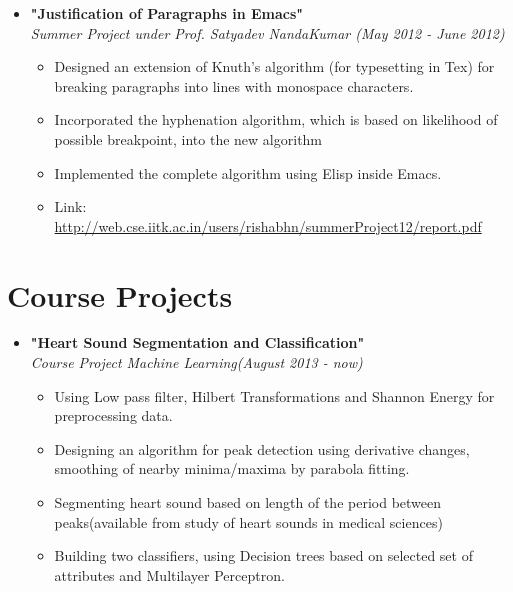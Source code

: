 \documentclass[margin,line]{resume}
\begin{document}
\begin{resume}
\begin{itemize}
  \item \large{\textbf{\textsf{"Justification of Paragraphs in Emacs"}}}
    \\ \small{\textit{Summer Project under Prof. Satyadev NandaKumar (May 2012 - June 2012)}}
    \normalsize
    \begin{itemize}
    \item Designed an extension of Knuth's algorithm (for typesetting in Tex) for breaking paragraphs into lines with monospace characters.
    \item Incorporated the hyphenation algorithm, which is based on likelihood of possible breakpoint, into the new algorithm
    \item Implemented the complete algorithm using Elisp inside Emacs.
    \item Link: \url{http://web.cse.iitk.ac.in/users/rishabhn/summerProject12/report.pdf}
    \end{itemize}
    
  \end{itemize}

  \newpage
  \section{\mysidestyle Course Projects}

  \begin{itemize}

  \item \large{\textbf{\textsf{"Heart Sound Segmentation and Classification"}}}
    \\ \small{\textit{Course Project Machine Learning(August 2013 - now)}}
    \normalsize
    \begin{itemize}      
    \item Using Low pass filter, Hilbert Transformations and Shannon Energy for preprocessing data.
    \item Designing an algorithm for peak detection using derivative changes, smoothing of nearby minima/maxima by parabola fitting.
    \item Segmenting heart sound based on length of the period between peaks(available from study of heart sounds in medical sciences)
    \item Building two classifiers, using Decision trees based on selected set of attributes and Multilayer Perceptron.

    \end{itemize}


\end{itemize}
\end{resume}
\end{document}

